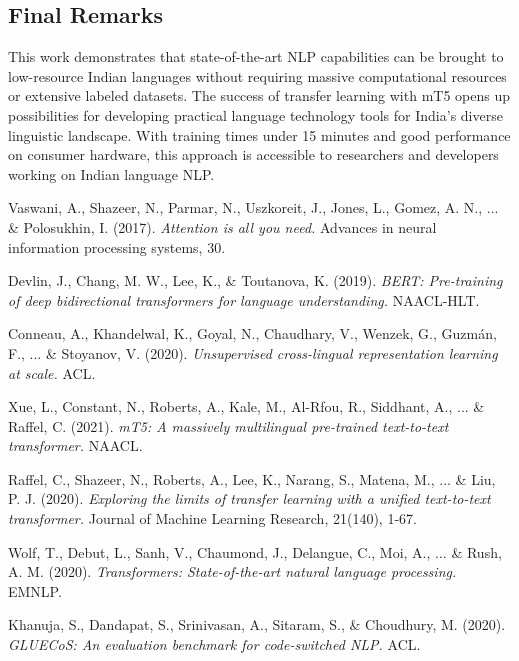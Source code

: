 \documentclass[12pt,a4paper]{article}
\begin{document}
\subsection{Final Remarks}
This work demonstrates that state-of-the-art NLP capabilities can be brought to low-resource Indian languages without requiring massive computational resources or extensive labeled datasets. The success of transfer learning with mT5 opens up possibilities for developing practical language technology tools for India's diverse linguistic landscape. With training times under 15 minutes and good performance on consumer hardware, this approach is accessible to researchers and developers working on Indian language NLP.

\newpage

\begin{thebibliography}{9}

Vaswani, A., Shazeer, N., Parmar, N., Uszkoreit, J., Jones, L., Gomez, A. N., ... \& Polosukhin, I. (2017).
\textit{Attention is all you need.}
Advances in neural information processing systems, 30.

Devlin, J., Chang, M. W., Lee, K., \& Toutanova, K. (2019).
\textit{BERT: Pre-training of deep bidirectional transformers for language understanding.}
NAACL-HLT.

Conneau, A., Khandelwal, K., Goyal, N., Chaudhary, V., Wenzek, G., Guzmán, F., ... \& Stoyanov, V. (2020).
\textit{Unsupervised cross-lingual representation learning at scale.}
ACL.

Xue, L., Constant, N., Roberts, A., Kale, M., Al-Rfou, R., Siddhant, A., ... \& Raffel, C. (2021).
\textit{mT5: A massively multilingual pre-trained text-to-text transformer.}
NAACL.

Raffel, C., Shazeer, N., Roberts, A., Lee, K., Narang, S., Matena, M., ... \& Liu, P. J. (2020).
\textit{Exploring the limits of transfer learning with a unified text-to-text transformer.}
Journal of Machine Learning Research, 21(140), 1-67.

Wolf, T., Debut, L., Sanh, V., Chaumond, J., Delangue, C., Moi, A., ... \& Rush, A. M. (2020).
\textit{Transformers: State-of-the-art natural language processing.}
EMNLP.

Khanuja, S., Dandapat, S., Srinivasan, A., Sitaram, S., \& Choudhury, M. (2020).
\textit{GLUECoS: An evaluation benchmark for code-switched NLP.}
ACL.


\end{thebibliography}
\end{document}
